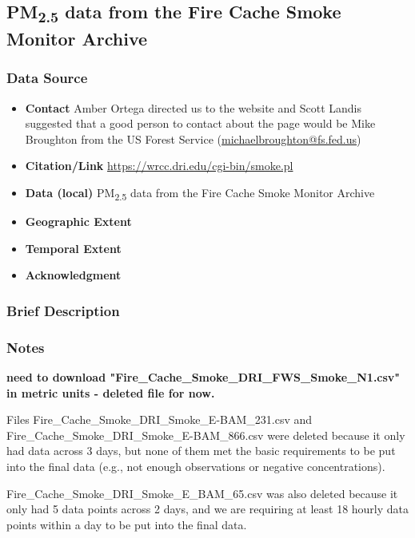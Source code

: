 \subsection{\texorpdfstring{PM\textsubscript{2.5}}{} data from the Fire Cache Smoke Monitor Archive}

\subsubsection*{Data Source}

\begin{itemize}[nolistsep]
\item \textbf{Contact} Amber Ortega directed us to the website and Scott Landis suggested that a good person to contact about the page would be Mike Broughton from the US Forest Service (\url{michaelbroughton@fs.fed.us})
\item \textbf{Citation/Link} \url{https://wrcc.dri.edu/cgi-bin/smoke.pl}
\item \textbf{Data (local)} PM\textsubscript{2.5} data from the Fire Cache Smoke Monitor Archive
\item \textbf{Geographic Extent} 
\item \textbf{Temporal Extent} 
\item \textbf{Acknowledgment} 
\end{itemize}

\subsubsection*{Brief Description}

\subsubsection*{Notes}

\textbf{need to download "Fire\_Cache\_Smoke\_DRI\_FWS\_Smoke\_N1.csv" in metric units - deleted file for now.}

Files Fire\_Cache\_Smoke\_DRI\_Smoke\_E-BAM\_231.csv and Fire\_Cache\_Smoke\_DRI\_Smoke\_E-BAM\_866.csv were deleted because it only had data across 3 days, but none of them met the basic requirements to be put into the final data (e.g., not enough observations or negative concentrations).

Fire\_Cache\_Smoke\_DRI\_Smoke\_E\_BAM\_65.csv was also deleted because it only had 5 data points across 2 days, and we are requiring at least 18 hourly data points within a day to be put into the final data.

